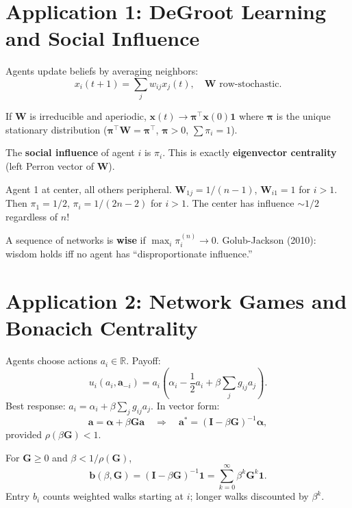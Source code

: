 \section{Application 1: DeGroot Learning and Social Influence}
\label{sec:spec:degroot}

Agents update beliefs by averaging neighbors:
\[
x_i(t+1) = \sum_j w_{ij} x_j(t), \quad \bm{W} \text{ row-stochastic}.
\]

\begin{proposition}
If $\bm{W}$ is irreducible and aperiodic, $\bm{x}(t) \to \bm{\pi}^\top \bm{x}(0) \bm{1}$ where $\bm{\pi}$ is the unique stationary distribution ($\bm{\pi}^\top \bm{W} = \bm{\pi}^\top$, $\bm{\pi} > 0$, $\sum \pi_i = 1$).
\end{proposition}

The \textbf{social influence} of agent $i$ is $\pi_i$. This is exactly \textbf{eigenvector centrality} (left Perron vector of $\bm{W}$).

\begin{example}
Agent 1 at center, all others peripheral. $\bm{W}_{1j} = 1/(n-1)$, $\bm{W}_{i1} = 1$ for $i>1$. Then $\pi_1 = 1/2$, $\pi_i = 1/(2n-2)$ for $i>1$. The center has influence $\sim 1/2$ regardless of $n$!
\end{example}

\begin{definition}
A sequence of networks is \textbf{wise} if $\max_i \pi_i^{(n)} \to 0$. Golub-Jackson (2010): wisdom holds iff no agent has ``disproportionate influence.''
\end{definition}

\section{Application 2: Network Games and Bonacich Centrality}
\label{sec:spec:games}

Agents choose actions $a_i \in \mathbb{R}$. Payoff:
\[
u_i(a_i, \bm{a}_{-i}) = a_i \left( \alpha_i - \frac{1}{2} a_i + \beta \sum_j g_{ij} a_j \right).
\]
Best response: $a_i = \alpha_i + \beta \sum_j g_{ij} a_j$. In vector form:
\[
\bm{a} = \bm{\alpha} + \beta \bm{G} \bm{a} \quad \Rightarrow \quad \bm{a}^* = (\bm{I} - \beta \bm{G})^{-1} \bm{\alpha},
\]
provided $\rho(\beta \bm{G}) < 1$.

\begin{definition}
For $\bm{G} \ge 0$ and $\beta < 1/\rho(\bm{G})$,
\[
\bm{b}(\beta, \bm{G}) = (\bm{I} - \beta \bm{G})^{-1} \bm{1} = \sum_{k=0}^\infty \beta^k \bm{G}^k \bm{1}.
\]
Entry $b_i$ counts weighted walks starting at $i$; longer walks discounted by $\beta^k$.
\end{definition}

